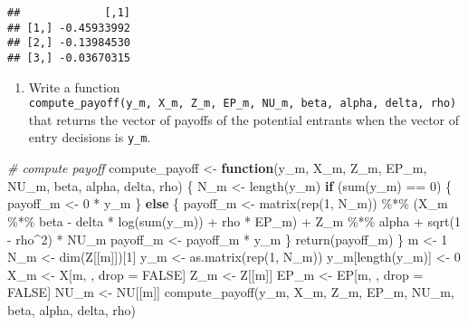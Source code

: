 \documentclass[
]{article}
\newenvironment{Shaded}{\begin{snugshade}}{\end{snugshade}}
\newcommand{\CommentTok}[1]{\textcolor[rgb]{0.56,0.35,0.01}{\textit{#1}}}
\newcommand{\ConstantTok}[1]{\textcolor[rgb]{0.00,0.00,0.00}{#1}}
\newcommand{\ControlFlowTok}[1]{\textcolor[rgb]{0.13,0.29,0.53}{\textbf{#1}}}
\newcommand{\DecValTok}[1]{\textcolor[rgb]{0.00,0.00,0.81}{#1}}
\newcommand{\FunctionTok}[1]{\textcolor[rgb]{0.00,0.00,0.00}{#1}}
\newcommand{\NormalTok}[1]{#1}
\newcommand{\OtherTok}[1]{\textcolor[rgb]{0.56,0.35,0.01}{#1}}
\newcommand{\SpecialCharTok}[1]{\textcolor[rgb]{0.00,0.00,0.00}{#1}}
\providecommand{\tightlist}{%
  \setlength{\itemsep}{0pt}\setlength{\parskip}{0pt}}
\begin{document}
\begin{verbatim}
##             [,1]
## [1,] -0.45933992
## [2,] -0.13984530
## [3,] -0.03670315
\end{verbatim}

\begin{enumerate}
\def\labelenumi{\arabic{enumi}.}
\setcounter{enumi}{3}
\tightlist
\item
  Write a function
  \texttt{compute\_payoff(y\_m,\ X\_m,\ Z\_m,\ EP\_m,\ NU\_m,\ beta,\ alpha,\ delta,\ rho)}
  that returns the vector of payoffs of the potential entrants when the
  vector of entry decisions is \texttt{y\_m}.
\end{enumerate}

\begin{Shaded}
\begin{Highlighting}[]
\CommentTok{\# compute payoff}
\NormalTok{compute\_payoff }\OtherTok{\textless{}{-}}
  \ControlFlowTok{function}\NormalTok{(y\_m, X\_m, Z\_m, EP\_m, NU\_m, beta, alpha, delta, rho) \{}
\NormalTok{    N\_m }\OtherTok{\textless{}{-}} \FunctionTok{length}\NormalTok{(y\_m)}
    \ControlFlowTok{if}\NormalTok{ (}\FunctionTok{sum}\NormalTok{(y\_m) }\SpecialCharTok{==} \DecValTok{0}\NormalTok{) \{}
\NormalTok{      payoff\_m }\OtherTok{\textless{}{-}} \DecValTok{0} \SpecialCharTok{*}\NormalTok{ y\_m}
\NormalTok{    \} }\ControlFlowTok{else}\NormalTok{ \{}
\NormalTok{      payoff\_m }\OtherTok{\textless{}{-}} \FunctionTok{matrix}\NormalTok{(}\FunctionTok{rep}\NormalTok{(}\DecValTok{1}\NormalTok{, N\_m)) }\SpecialCharTok{\%*\%}\NormalTok{ (X\_m }\SpecialCharTok{\%*\%}\NormalTok{ beta }\SpecialCharTok{{-}}\NormalTok{ delta }\SpecialCharTok{*} \FunctionTok{log}\NormalTok{(}\FunctionTok{sum}\NormalTok{(y\_m)) }\SpecialCharTok{+}\NormalTok{ rho }\SpecialCharTok{*}\NormalTok{ EP\_m) }\SpecialCharTok{+}\NormalTok{ Z\_m }\SpecialCharTok{\%*\%}\NormalTok{ alpha }\SpecialCharTok{+} \FunctionTok{sqrt}\NormalTok{(}\DecValTok{1} \SpecialCharTok{{-}}\NormalTok{ rho}\SpecialCharTok{\^{}}\DecValTok{2}\NormalTok{) }\SpecialCharTok{*}\NormalTok{ NU\_m }
\NormalTok{      payoff\_m }\OtherTok{\textless{}{-}}\NormalTok{ payoff\_m }\SpecialCharTok{*}\NormalTok{ y\_m}
\NormalTok{    \}}
    \FunctionTok{return}\NormalTok{(payoff\_m)}
\NormalTok{  \}}
\NormalTok{m }\OtherTok{\textless{}{-}} \DecValTok{1}
\NormalTok{N\_m }\OtherTok{\textless{}{-}} \FunctionTok{dim}\NormalTok{(Z[[m]])[}\DecValTok{1}\NormalTok{]}
\NormalTok{y\_m }\OtherTok{\textless{}{-}} \FunctionTok{as.matrix}\NormalTok{(}\FunctionTok{rep}\NormalTok{(}\DecValTok{1}\NormalTok{, N\_m))}
\NormalTok{y\_m[}\FunctionTok{length}\NormalTok{(y\_m)] }\OtherTok{\textless{}{-}} \DecValTok{0}
\NormalTok{X\_m }\OtherTok{\textless{}{-}}\NormalTok{ X[m, , drop }\OtherTok{=} \ConstantTok{FALSE}\NormalTok{]}
\NormalTok{Z\_m }\OtherTok{\textless{}{-}}\NormalTok{ Z[[m]]}
\NormalTok{EP\_m }\OtherTok{\textless{}{-}}\NormalTok{ EP[m, , drop }\OtherTok{=} \ConstantTok{FALSE}\NormalTok{]}
\NormalTok{NU\_m }\OtherTok{\textless{}{-}}\NormalTok{ NU[[m]]}
\FunctionTok{compute\_payoff}\NormalTok{(y\_m, X\_m, Z\_m, EP\_m, NU\_m, beta, alpha, delta, rho)}
\end{Highlighting}
\end{Shaded}
\end{document}
